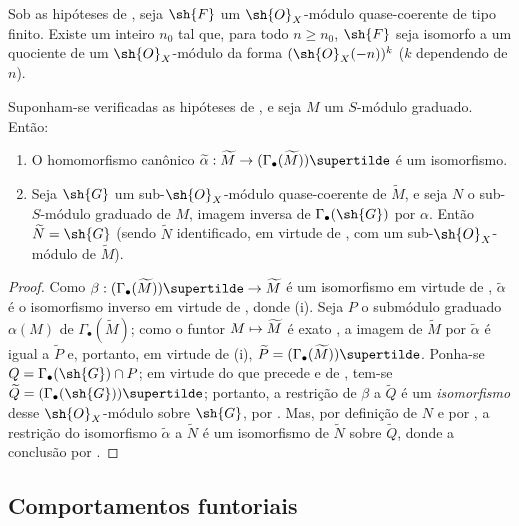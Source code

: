 \documentclass[oneside,10pt]{amsart}
\makeatletter
\renewcommand{\geq}{\geqslant}
\newcommand{\ega@arrow}[2]{\mathchoice{#1}{#2}{#2}{#2}}
\let\ega@shortmapsto\mapsto
\renewcommand{\to}{\ega@arrow{\longrightarrow}{\rightarrow}}
\renewcommand{\mapsto}{\ega@arrow{\longmapsto}{\ega@shortmapsto}}
\let\EGAOriginalLabel\label
\renewcommand{\label}[1]{\phantomsection\EGAOriginalLabel{#1}}
\makeatother
\begin{document}
\begin{corollary}[2.7.10]
\label{II.2.7.10}
Sob as hipóteses de , seja $\sh{F}$ um $\sh{O}_X$-módulo quase-coerente de tipo finito.
Existe um inteiro $n_0$ tal que, para todo $n\geq n_0$, $\sh{F}$ seja isomorfo a um quociente de um $\sh{O}_X$-módulo da forma $(\sh{O}_X(-n))^k$ ($k$ dependendo de $n$).
\end{corollary}

\begin{proposition}[2.7.11]
\label{II.2.7.11}
Suponham-se verificadas as hipóteses de , e seja $M$ um $S$-módulo graduado.
Então:
\begin{enumerate}
  \item[\rm{(i)}] O homomorfismo canônico $\widetilde{\alpha}:\widetilde{M}\to(\Gamma_\bullet(\widetilde{M}))\supertilde$ é um isomorfismo.
  \item[\rm{(ii)}] Seja $\sh{G}$ um sub-$\sh{O}_X$-módulo quase-coerente de $\widetilde{M}$, e seja $N$ o sub-$S$-módulo graduado de $M$, imagem inversa de $\Gamma_\bullet(\sh{G})$ por $\alpha$.
    Então $\widetilde{N}=\sh{G}$ (sendo $\widetilde{N}$ identificado, em virtude de , com um sub-$\sh{O}_X$-módulo de $\widetilde{M}$).
\end{enumerate}
\end{proposition}

\begin{proof}
Como $\beta:(\Gamma_\bullet(\widetilde{M}))\supertilde\to\widetilde{M}$ é um isomorfismo em virtude de , $\widetilde{\alpha}$ é o isomorfismo inverso em virtude de , donde (i).
Seja $P$ o submódulo graduado $\alpha(M)$ de $\Gamma_\bullet(\widetilde{M})$;
como o funtor $M\mapsto\widetilde{M}$ é exato , a imagem de $\widetilde{M}$ por $\widetilde{\alpha}$ é igual a $\widetilde{P}$ e, portanto, em virtude de (i), $\widetilde{P}=(\Gamma_\bullet(\widetilde{M}))\supertilde$.
Ponha-se $Q=\Gamma_\bullet(\sh{G})\cap P$;
em virtude do que precede e de , tem-se $\widetilde{Q}=(\Gamma_\bullet(\sh{G}))\supertilde$; portanto, a restrição de $\beta$ a $\widetilde{Q}$ é um \emph{isomorfismo} desse $\sh{O}_X$-módulo sobre $\sh{G}$, por .
Mas, por definição de $N$ e por , a restrição do isomorfismo $\widetilde{\alpha}$ a $\widetilde{N}$ é um isomorfismo de $\widetilde{N}$ sobre $\widetilde{Q}$, donde a conclusão por .
\end{proof}

\subsection{Comportamentos funtoriais}
\label{subsection:II.2.8}
\end{document}
